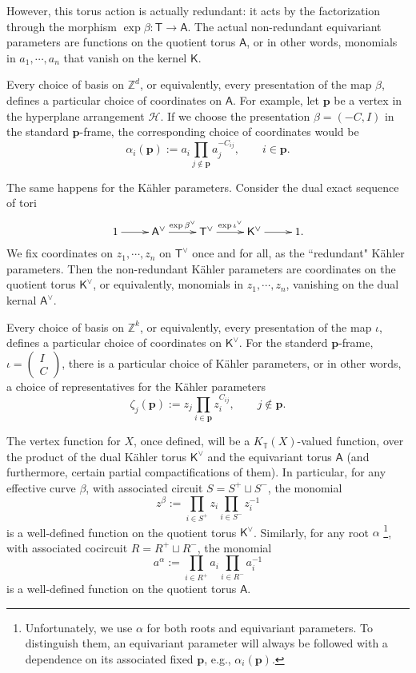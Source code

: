 \documentclass[10pt]{amsart}
\theoremstyle{definition}
\def\ZZ{{\mathbb{Z}}}
\def\TT{\mathbb{T}}
\newcommand{\bp}{\mathbf{p}}
\newcommand{\cH}{\mathcal{H}}
\newcommand{\bA}{\mathsf{A}}
\newcommand{\bT}{\mathsf{T}}
\newcommand{\bK}{\mathsf{K}}
\theoremstyle{definition}
\numberwithin{equation}{section}
\theoremstyle{Theorem}
\begin{document}
However, this torus action is actually redundant: it acts by the factorization through the morphism $\exp \beta: \bT \to \bA$. The actual non-redundant equivariant parameters are functions on the quotient torus $\bA$, or in other words, monomials in $a_1, \cdots, a_n$ that vanish on the kernel $\bK$.

Every choice of basis on $\ZZ^d$, or equivalently, every presentation of the map $\beta$, defines a particular choice of coordinates on $\bA$. For example, let $\bp$ be a vertex in the hyperplane arrangement $\cH$. If we choose the presentation $\beta = (-C , I)$ in the standard $\bp$-frame, the corresponding choice of coordinates would be
$$
\alpha_i (\bp) :=  a_i \prod_{j\not\in \bp} a_j^{-C_{ij}}, \qquad i\in \bp.
$$

The same happens for the K\"ahler parameters. Consider the dual exact sequence of tori
$$
\xymatrix{
	1 \ar[r] & \bA^\vee \ar[r]^-{\exp \beta^\vee} & \bT^\vee \ar[r]^-{\exp \iota^\vee} & \bK^\vee \ar[r] & 1.
}
$$
We fix coordinates on $z_1, \cdots, z_n$ on $\bT^\vee$ once and for all, as the ``redundant" K\"ahler parameters. Then the non-redundant K\"ahler parameters are coordinates on the quotient torus $\bK^\vee$, or equivalently, monomials in $z_1, \cdots, z_n$, vanishing on the dual kernal $\bA^\vee$.

Every choice of basis on $\ZZ^k$, or equivalently, every presentation of the map $\iota$, defines a particular choice of coordinates on $\bK^\vee$. For the standerd $\bp$-frame, $\iota = \begin{pmatrix}
I \\
C
\end{pmatrix}$, there is a particular choice of K\"ahler parameters, or in other words,  a choice of representatives for the K\"ahler parameters
$$
\zeta_j (\bp) := z_j \prod_{i\in \bp} z_i^{C_{ij}}, \qquad j\not\in \bp.
$$

The vertex function for $X$, once defined, will be a $K_\TT (X)$-valued function, over the product of the dual K\"ahler torus $\bK^\vee$ and the equivariant torus $\bA$ (and furthermore, certain partial compactifications of them). In particular, for any effective curve $\beta$, with associated circuit $S = S^+ \sqcup S^-$, the monomial
$$
z^\beta := \prod_{i\in S^+} z_i \prod_{i\in S^-} z_i^{-1}
$$
is a well-defined function on the quotient torus $\bK^\vee$. Similarly, for any root $\alpha$ \footnote{Unfortunately, we use $\alpha$ for both roots and equivariant parameters. To distinguish them, an equivariant parameter will always be followed with a dependence on its associated fixed $\bp$, e.g., $\alpha_i (\bp)$.}, with associated cocircuit $R = R^+ \sqcup R^-$, the monomial
$$
a^\alpha := \prod_{i\in R^+} a_i \prod_{i\in R^-} a_i^{-1}
$$
is a well-defined function on the quotient torus $\bA$.
\end{document}
